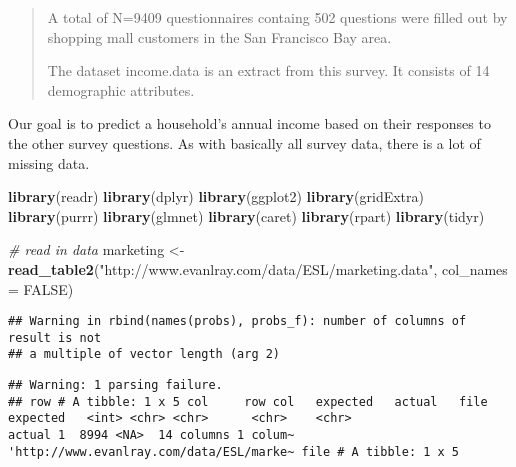 \documentclass[]{article}
\newenvironment{Shaded}{\begin{snugshade}}{\end{snugshade}}
\newcommand{\KeywordTok}[1]{\textcolor[rgb]{0.13,0.29,0.53}{\textbf{#1}}}
\newcommand{\DataTypeTok}[1]{\textcolor[rgb]{0.13,0.29,0.53}{#1}}
\newcommand{\StringTok}[1]{\textcolor[rgb]{0.31,0.60,0.02}{#1}}
\newcommand{\CommentTok}[1]{\textcolor[rgb]{0.56,0.35,0.01}{\textit{#1}}}
\newcommand{\OtherTok}[1]{\textcolor[rgb]{0.56,0.35,0.01}{#1}}
\newcommand{\NormalTok}[1]{#1}
\begin{document}
\begin{quote}
A total of N=9409 questionnaires containg 502 questions were filled out
by shopping mall customers in the San Francisco Bay area.

The dataset income.data is an extract from this survey. It consists of
14 demographic attributes.
\end{quote}

Our goal is to predict a household's annual income based on their
responses to the other survey questions. As with basically all survey
data, there is a lot of missing data.

\begin{Shaded}
\begin{Highlighting}[]
\KeywordTok{library}\NormalTok{(readr)}
\KeywordTok{library}\NormalTok{(dplyr)}
\KeywordTok{library}\NormalTok{(ggplot2)}
\KeywordTok{library}\NormalTok{(gridExtra)}
\KeywordTok{library}\NormalTok{(purrr)}
\KeywordTok{library}\NormalTok{(glmnet)}
\KeywordTok{library}\NormalTok{(caret)}
\KeywordTok{library}\NormalTok{(rpart)}
\KeywordTok{library}\NormalTok{(tidyr)}

\CommentTok{# read in data}
\NormalTok{marketing <-}\StringTok{ }\KeywordTok{read_table2}\NormalTok{(}\StringTok{"http://www.evanlray.com/data/ESL/marketing.data"}\NormalTok{, }\DataTypeTok{col_names =} \OtherTok{FALSE}\NormalTok{)}
\end{Highlighting}
\end{Shaded}

\begin{verbatim}
## Warning in rbind(names(probs), probs_f): number of columns of result is not
## a multiple of vector length (arg 2)
\end{verbatim}

\begin{verbatim}
## Warning: 1 parsing failure.
## row # A tibble: 1 x 5 col     row col   expected   actual   file                                     expected   <int> <chr> <chr>      <chr>    <chr>                                    actual 1  8994 <NA>  14 columns 1 colum~ 'http://www.evanlray.com/data/ESL/marke~ file # A tibble: 1 x 5
\end{verbatim}
\end{document}
